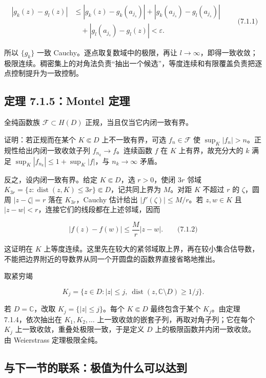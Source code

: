 \documentclass[11pt,a4paper]{article}
\begin{document}
\[
\begin{aligned}
|g_k(z)-g_l(z)|
&\le |g_k(z)-g_k(a_{j_s})|+|g_k(a_{j_s})-g_l(a_{j_s})|\\
&\quad+|g_l(a_{j_s})-g_l(z)|<\varepsilon.
\end{aligned}\qquad\text{(7.1.1)}
\]

所以 \(\{g_k\}\) 一致 Cauchy。逐点取复数域中的极限，再让
\(l\to\infty\)，即得一致收敛；极限连续。稠密集上的对角法负责``抽出一个候选''，等度连续和有限覆盖负责把逐点控制提升为一致控制。

\subsection{定理 7.1.5：Montel 定理}\label{ch07-s1-heading-6}

全纯函数族 \(\mathcal F\subset H(D)\) 正规，当且仅当它内闭一致有界。

证明：若正规而在某个 \(K\Subset D\) 上不一致有界，可选
\(f_n\in\mathcal F\) 使 \(\sup_K|f_n|>n\)。正规性给出内闭一致收敛子列
\(f_{n_k}\to f\)。连续函数 \(f\) 在 \(K\) 上有界，故充分大的 \(k\) 满足
\(\sup_K|f_{n_k}|\le1+\sup_K|f|\)，与 \(n_k\to\infty\) 矛盾。

反之，设内闭一致有界。给定 \(K\Subset D\)，选 \(r>0\)，使闭 \(3r\) 邻域
\(K_{3r}=\{z:\operatorname{dist}(z,K)\le3r\}\Subset D\)，记共同上界为
\(M\)。对距 \(K\) 不超过 \(r\) 的 \(\zeta\)，圆周 \(|z-\zeta|=r\) 落在
\(K_{3r}\)，Cauchy 估计给出 \(|f'(\zeta)|\le M/r\)。若 \(z,w\in K\) 且
\(|z-w|<r\)，连接它们的线段都在上述邻域，因而

\[
|f(z)-f(w)|\le\frac Mr|z-w|.\qquad\text{(7.1.2)}
\]

这证明在 \(K\)
上等度连续。这里先在较大的紧邻域取上界，再在较小集合估导数，不能把边界附近的导数界从同一个开圆盘的函数界直接省略地推出。

取紧穷竭

\[
K_j=\{z\in D:|z|\le j,\ \operatorname{dist}(z,\mathbb C\setminus D)\ge1/j\}.
\]

若 \(D=\mathbb C\)，改取 \(K_j=\{|z|\le j\}\)。每个 \(K\Subset D\)
最终包含于某个 \(K_j\)。由定理 7.1.4，依次抽出在 \(K_1,K_2,\ldots\)
上一致收敛的嵌套子列，再取对角子列；它在每个 \(K_j\)
上一致收敛，重叠处极限一致，于是定义 \(D\)
上的极限函数并内闭一致收敛。由 Weierstrass 定理极限全纯。

\subsection*{与下一节的联系：极值为什么可以达到}\label{ch07-s1-heading-7}
\end{document}
